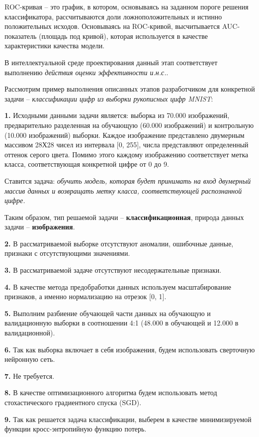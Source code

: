 ROC-кривая -- это график, в котором, основываясь на заданном пороге решения классификатора, рассчитываются доли ложноположительных и истинно положительных исходов. Основываясь на ROC-кривой, высчитывается AUC-показатель (площадь под кривой), которая используется в качестве характеристики качества модели.

В интеллектуальной среде проектирования данный этап соответствует выполнению \textit{действия оценки эффективности и.н.с.}.

Рассмотрим пример выполнения описанных этапов разработчиком для конкретной задачи -- \textit{классификации цифр из выборки рукописных цифр MNIST}:


\textbf{1.} Исходными данными задачи является: выборка из 70.000 изображений, предварительно разделенная на обучающую (60.000 изображений) и контрольную (10.000 изображений) выборки. Каждое изображение представлено двумерным массивом 28Х28 чисел из интервала [0, 255], числа представляют определенный оттенок серого цвета. Помимо этого каждому изображению соответствует метка класса, соответствующая конкретной цифре от 0 до 9.

Ставится задача: \textit{обучить модель, которая будет принимать на вход двумерный массив данных и возвращать метку класса, соответствующей распознанной цифре.}

Таким образом, тип решаемой задачи -- \textbf{классификационная}, природа данных задачи -- \textbf{изображения}.


\textbf{2.} В рассматриваемой выборке отсутствуют аномалии, ошибочные данные, признаки с отсутствующими значениями.


\textbf{3.} В рассматриваемой задаче отсутствуют несодержательные признаки.


\textbf{4.} В качестве метода предобработки данных используем масштабирование признаков, а именно нормализацию на отрезок [0, 1].


\textbf{5.} Выполним разбиение обучающей части данных на обучающую и валидационную выборки в соотношении 4:1 (48.000 в обучающей и 12.000 в валидационной).


\textbf{6.} Так как выборка включает в себя изображения, будем использовать сверточную нейронную сеть.


\textbf{7.} Не требуется.


\textbf{8.} В качестве оптимизационного алгоритма будем использовать метод стохастического градиентного спуска (SGD).


\textbf{9.} Так как решается задача классификации, выберем в качестве минимизируемой функции кросс-энтропийную функцию потерь.


